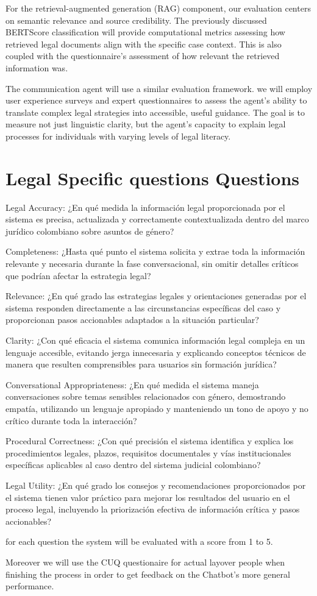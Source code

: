 For the retrieval-augmented generation (RAG) component, our evaluation 
centers on semantic relevance and source credibility. The previously 
discussed BERTScore classification will provide 
computational metrics assessing how retrieved legal documents align with the specific case context. This is also coupled with the questionnaire's assessment of how relevant the retrieved information was.

The communication agent will use a similar evaluation framework. 
we will employ user experience 
surveys and expert questionnaires to assess the agent's ability to translate 
complex legal strategies into accessible, useful guidance. The goal 
is to measure not just linguistic clarity, but the agent's capacity to 
explain legal processes for individuals with varying levels of legal 
literacy.

\section{Legal Specific questions Questions}
Legal Accuracy:
¿En qué medida la información legal proporcionada por el sistema es precisa, actualizada y correctamente contextualizada dentro del marco jurídico colombiano sobre asuntos de género?

Completeness:
¿Hasta qué punto el sistema solicita y extrae toda la información relevante y necesaria durante la fase conversacional, sin omitir detalles críticos que podrían afectar la estrategia legal?

Relevance:
¿En qué grado las estrategias legales y orientaciones generadas por el sistema responden directamente a las circunstancias específicas del caso y proporcionan pasos accionables adaptados a la situación particular?

Clarity:
¿Con qué eficacia el sistema comunica información legal compleja en un lenguaje accesible, evitando jerga innecesaria y explicando conceptos técnicos de manera que resulten comprensibles para usuarios sin formación jurídica?

Conversational Appropriateness:
¿En qué medida el sistema maneja conversaciones sobre temas sensibles relacionados con género, demostrando empatía, utilizando un lenguaje apropiado y manteniendo un tono de apoyo y no crítico durante toda la interacción?

Procedural Correctness:
¿Con qué precisión el sistema identifica y explica los procedimientos legales, plazos, requisitos documentales y vías institucionales específicas aplicables al caso dentro del sistema judicial colombiano?

Legal Utility:
¿En qué grado los consejos y recomendaciones proporcionados por el sistema tienen valor práctico para mejorar los resultados del usuario en el proceso legal, incluyendo la priorización efectiva de información crítica y pasos accionables?

for each question the system will be evaluated with a score from 1 to 5.

Moreover we will use the CUQ questionaire for actual layover people
when finishing the process in order to get feedback on the Chatbot's more general performance. 